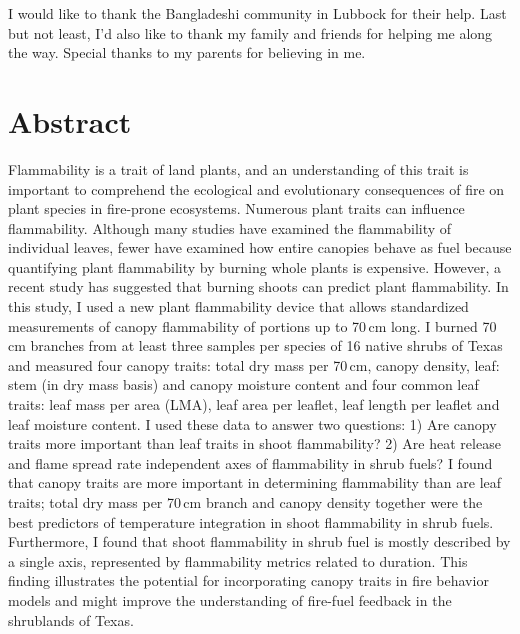 \documentclass{ttuthes2007}
\begin{document}
I would like to thank the Bangladeshi community in Lubbock for their help. Last but not least, I'd  also like to thank my family and friends for helping me along the way. Special thanks to my parents for believing in me. 
\newpage
\begin{singlespace}
\tableofcontents
\end{singlespace}
\chapter{\textbf{Abstract}}
\noindent Flammability is a trait of land plants, and an understanding of this trait is important to comprehend the ecological and evolutionary consequences of fire on plant species in fire-prone ecosystems. Numerous plant traits can influence flammability. Although many studies have examined the flammability of individual leaves, fewer have examined how entire canopies behave as fuel because quantifying plant flammability by burning whole plants is expensive. However, a recent study has suggested that burning shoots can predict plant flammability. %
In this study, I used a new plant flammability device that allows standardized measurements of canopy flammability of portions up to 70\,cm long. %
 I burned 70\,cm branches from at least three samples per species of 16 native shrubs of Texas and measured four canopy traits: total dry mass per 70\,cm, canopy density, leaf: stem (in dry mass basis) and canopy moisture content and four common leaf traits: leaf mass per area (LMA), leaf area per leaflet, leaf length per leaflet and leaf moisture content. I used these data to answer two questions: 1) Are canopy traits more important than leaf traits in shoot flammability? 2) Are heat release and flame spread rate independent axes of flammability in shrub fuels? I found that canopy traits are more important in determining flammability than are leaf traits; total dry mass per 70\,cm branch and canopy density together were the best predictors of temperature integration in shoot flammability in shrub fuels. Furthermore, I found that shoot flammability in shrub fuel is mostly described by a single axis, represented by flammability metrics related to duration. This finding illustrates the potential for incorporating canopy traits in fire behavior models and might improve the understanding of fire-fuel feedback in the shrublands of Texas.
\end{document}
